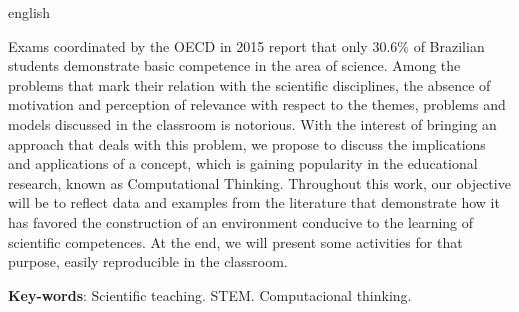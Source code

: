 \begin{resumo}[Abstract]
 \begin{otherlanguage*}{english}
  
  Exams coordinated by the OECD in 2015 report that only $ 30.6 \% $ of Brazilian students demonstrate basic competence in the area of science. Among the problems that mark their relation with the scientific disciplines, the absence of motivation and perception of relevance with respect to the themes, problems and models discussed in the classroom is notorious. With the interest of bringing an approach that deals with this problem, we propose to discuss the implications and applications of a concept, which is gaining popularity in the educational research, known as Computational Thinking. Throughout this work, our objective will be to reflect data and examples from the literature that demonstrate how it has favored the construction of an environment conducive to the learning of scientific competences. At the end, we will present some activities for that purpose, easily reproducible in the classroom.
   \vspace{\onelineskip}
 
   \noindent 
   \textbf{Key-words}: Scientific teaching. STEM. Computacional thinking.
 \end{otherlanguage*}
\end{resumo}


